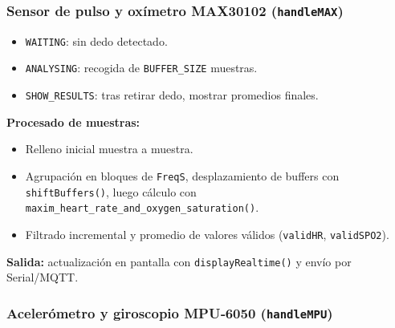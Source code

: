 \documentclass[12pt, a4paper]{article}
\begin{document}
	
	\subsubsection{Sensor de pulso y oxímetro MAX30102 (\texttt{handleMAX})}
	
	\begin{itemize}
		\item \texttt{WAITING}: sin dedo detectado.  
		\item \texttt{ANALYSING}: recogida de \texttt{BUFFER\_SIZE} muestras.  
		\item \texttt{SHOW\_RESULTS}: tras retirar dedo, mostrar promedios finales.  
	\end{itemize}
	 \textbf{Procesado de muestras:} 
	\begin{itemize}
		\item Relleno inicial muestra a muestra.
		\item Agrupación en bloques de \texttt{FreqS}, desplazamiento de buffers con \texttt{shiftBuffers()}, luego cálculo con \texttt{maxim\_heart\_rate\_and\_oxygen\_saturation()}.  
		\item Filtrado incremental y promedio de valores válidos (\texttt{validHR}, \texttt{validSPO2}).  
	\end{itemize}
	\textbf{Salida:} actualización en pantalla con \texttt{displayRealtime()} y envío por Serial/MQTT.

	
	
	\subsubsection{Acelerómetro y giroscopio MPU‑6050 (\texttt{handleMPU})}
	
\end{document}
